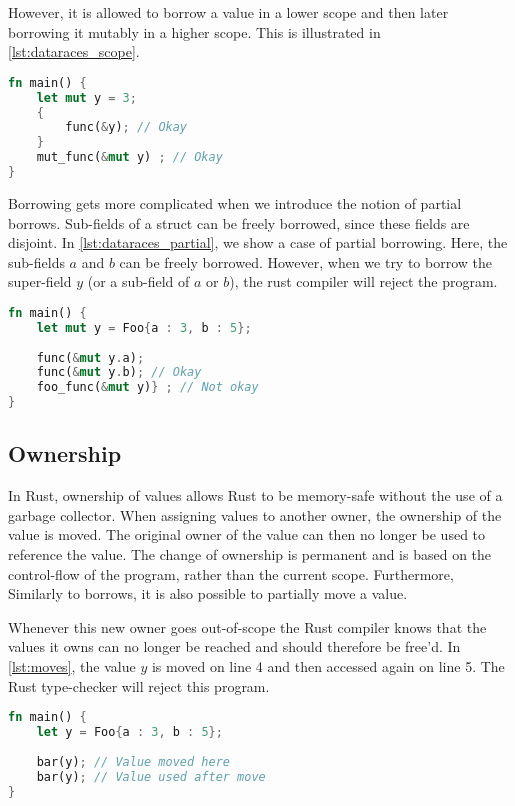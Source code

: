 However, it is allowed to borrow a value in a lower scope and then later borrowing it mutably in a higher scope. This is illustrated in \autoref{lst:dataraces_scope}.

 \begin{lstlisting}[language=rust, showstringspaces=false, escapechar=~, label={lst:dataraces_scope}, caption={Example of scoped borrow}]
fn main() { 
    let mut y = 3;
    {
        func(&y); // Okay
    }
    mut_func(&mut y) ; // Okay 
}
\end{lstlisting}

Borrowing gets more complicated when we introduce the notion of partial borrows. Sub-fields of a struct can be freely borrowed, since these fields are disjoint. In \autoref{lst:dataraces_partial}, we show a case of partial borrowing. Here, the sub-fields $a$ and $b$ can be freely borrowed. However, when we try to borrow the super-field $y$ (or a sub-field of $a$ or $b$), the rust compiler will reject the program.
 \begin{lstlisting}[language=rust, showstringspaces=false, escapechar=~, label={lst:dataraces_partial}, caption={Example of partial borrows}]
fn main() { 
    let mut y = Foo{a : 3, b : 5};
    
    func(&mut y.a);
    func(&mut y.b); // Okay
    foo_func(&mut y)} ; // Not okay 
}
\end{lstlisting}

\subsection{Ownership}
In Rust, ownership of values allows Rust to be memory-safe without the use of a garbage collector\cite{rust_book_ownership}. When assigning values to another owner, the ownership of the value is moved. The original owner of the value can then no longer be used to reference the value. The change of ownership is permanent and is based on the control-flow of the program, rather than the current scope. Furthermore, Similarly to borrows, it is also possible to partially move a value.

Whenever this new owner goes out-of-scope the Rust compiler knows that the values it owns can no longer be reached and should therefore be free'd. 
In \autoref{lst:moves}, the value $y$ is moved on line 4 and then accessed again on line 5. The Rust type-checker will reject this program. 
    
\begin{lstlisting}[language=rust, showstringspaces=false, escapechar=~, label={lst:moves}, caption={Example of moving variables}]
fn main() { 
    let y = Foo{a : 3, b : 5};
    
    bar(y); // Value moved here
    bar(y); // Value used after move
}
\end{lstlisting}

